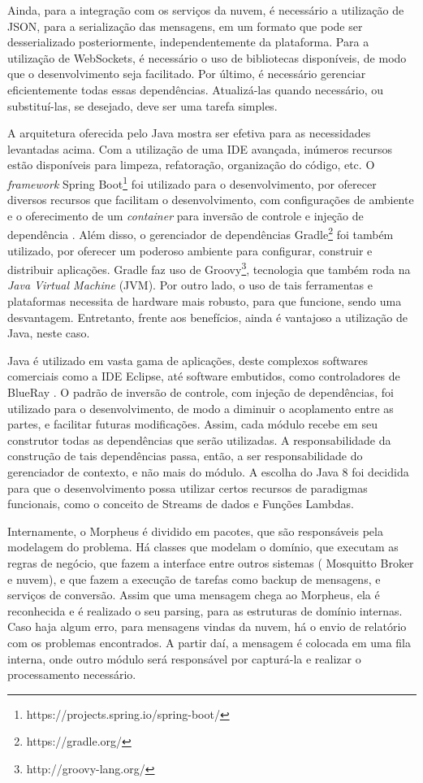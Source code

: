 Ainda, para a integração com os serviços da nuvem, é necessário a utilização de JSON, para a serialização das mensagens, em um formato que pode ser desserializado posteriormente, independentemente da plataforma. Para a utilização de WebSockets, é necessário o uso de bibliotecas disponíveis, de modo que o desenvolvimento seja facilitado. Por último, é necessário gerenciar eficientemente todas essas dependências. Atualizá-las quando necessário, ou substituí-las, se desejado, deve ser uma tarefa simples.

A arquitetura oferecida pelo Java mostra ser efetiva para as necessidades levantadas acima. Com a utilização de uma IDE avançada, inúmeros recursos estão disponíveis para limpeza, refatoração, organização do código, etc. O \emph{framework} Spring Boot\footnote{https://projects.spring.io/spring-boot/} foi utilizado para o desenvolvimento, por oferecer diversos recursos que facilitam o desenvolvimento, com configurações de ambiente e o oferecimento de um \emph{container} para inversão de controle e injeção de dependência \cite{iocFowler}. Além disso, o gerenciador de dependências Gradle\footnote{https://gradle.org/} foi também utilizado, por oferecer um poderoso ambiente para configurar, construir e distribuir aplicações. Gradle faz uso de Groovy\footnote{http://groovy-lang.org/}, tecnologia que também roda na \emph{Java Virtual Machine} (JVM). Por outro lado, o uso de tais ferramentas e plataformas necessita de hardware mais robusto, para que funcione, sendo uma desvantagem. Entretanto, frente aos benefícios, ainda é vantajoso a utilização de Java, neste caso.

Java é utilizado em vasta gama de aplicações, deste complexos softwares comerciais como a IDE Eclipse, até software embutidos, como controladores de BlueRay \cite{javaBlueray}.
O padrão de inversão de controle, com injeção de dependências, foi utilizado para o desenvolvimento, de modo a diminuir o acoplamento entre as partes, e facilitar futuras modificações. Assim, cada módulo recebe em seu construtor todas as dependências que serão utilizadas. A responsabilidade da construção de tais dependências passa, então, a ser responsabilidade do gerenciador de contexto, e não mais do módulo. A escolha do Java 8 foi decidida para que o desenvolvimento possa utilizar certos recursos de paradigmas funcionais, como o conceito de Streams de dados e Funções Lambdas.

Internamente, o Morpheus é dividido em pacotes, que são responsáveis pela modelagem do problema. Há classes que modelam o domínio, que executam as regras de negócio, que fazem a interface entre outros sistemas (\wmqtt{} Mosquitto Broker e nuvem), e que fazem a execução de tarefas como backup de mensagens, e serviços de conversão.
Assim que uma mensagem chega ao Morpheus, ela é reconhecida e é realizado o seu parsing, para as estruturas de domínio internas. Caso haja algum erro, para mensagens vindas da nuvem, há o envio de relatório com os problemas encontrados. A partir daí, a mensagem é colocada em uma fila interna, onde outro módulo será responsável por capturá-la e realizar o processamento necessário.

